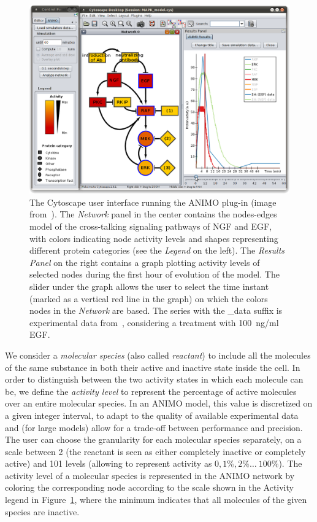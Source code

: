 \documentclass{llncs}
\begin{document}
\begin{figure}[htb]
\begin{center}
   \includegraphics[width=.6\textwidth]{images/mapk_model_egf4}
\end{center}
\caption{The Cytoscape user interface running the ANIMO plug-in
(image from~\cite{animo-ieee}). The \emph{Network} panel in the center contains the nodes-edges
model of the cross-talking signaling pathways of NGF and EGF, with
colors indicating node activity levels and shapes representing different protein categories (see the \emph{Legend} on the left).
The \emph{Results Panel} on the right contains a graph plotting activity levels of selected nodes
during the first hour of evolution of the model. The slider under the graph
allows the user to select the time instant (marked as a vertical red line in the graph) on which
the colors nodes in the \emph{Network} are based.
The series with the {\sf \_data} suffix is experimental
data from~\cite{egf-ngf}, considering a treatment with 100~ng/ml EGF.
\label{fig:cytoscape}}
\end{figure}

We consider a \emph{molecular species} (also called \emph{reactant}) to include all the molecules of the same substance in both their active
and inactive state inside the cell. In order to distinguish between the two activity states in which each molecule can be,
we define the \emph{activity level}
to represent the percentage of active molecules over an entire molecular species. In an ANIMO model, this value
is discretized on a given integer interval, to adapt to the quality
of available experimental data and (for large models) allow for a trade-off between performance and precision.
The user can choose the granularity for each molecular species separately, on a scale between 2 (the
reactant is seen as either completely inactive or completely active) and 101 levels (allowing to represent activity as $0, 1\%, 2\% \dots\ 100\%$).
The activity level of a molecular species is represented in the ANIMO network
by coloring the corresponding node according to the scale shown in the {\sf Activity} legend in Figure~\ref{fig:cytoscape},
where the minimum indicates that all molecules of the given species are inactive.
\end{document}
